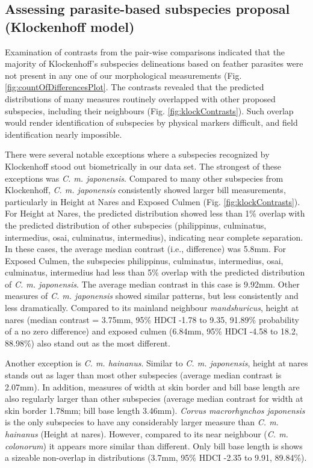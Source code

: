 \documentclass[10pt,a4paper]{article}
\begin{document}
\subsection{Assessing parasite-based subspecies proposal (Klockenhoff model)}\label{assessing-parasite-based-subspecies-proposal-klockenhoff-model}

Examination of contrasts from the pair-wise comparisons indicated that the majority of Klockenhoff's subspecies delineations based on feather parasites were not present in any one of our morphological measurements (Fig. \ref{fig:countOfDifferencesPlot}.
The contrasts revealed that the predicted distributions of many measures routinely overlapped with other proposed subspecies, including their neighbours (Fig. \ref{fig:klockContrasts}).
Such overlap would render identification of subspecies by physical markers difficult, and field identification nearly impossible.

There were several notable exceptions where a subspecies recognized by Klockenhoff stood out biometrically in our data set.
The strongest of these exceptions was \emph{C. m. japonensis}.
Compared to many other subspecies from Klockenhoff, \emph{C. m. japonensis} consistently showed larger bill measurements, particularly in Height at Nares and Exposed Culmen (Fig. \ref{fig:klockContrasts}).
For Height at Nares, the predicted distribution showed less than 1\% overlap with the predicted distribution of other subspecies (philippinus, culminatus, intermedius, osai, culminatus, intermedius), indicating near complete separation.
In these cases, the average median contrast (i.e., difference) was 5.8mm.
For Exposed Culmen, the subspecies philippinus, culminatus, intermedius, osai, culminatus, intermedius had less than 5\% overlap with the predicted distribution of \emph{C. m. japonensis}.
The average median contrast in this case is 9.92mm.
Other measures of \emph{C. m. japonensis} showed similar patterns, but less consistently and less dramatically.
Compared to its mainland neighbour \emph{mandshuricus}, height at nares (median contrast = 3.75mm, 95\% HDCI -1.78 to 9.35, 91.89\% probability of a no zero difference) and exposed culmen (6.84mm, 95\% HDCI -4.58 to 18.2, 88.98\%) also stand out as the most different.

Another exception is \emph{C. m. hainanus}.
Similar to \emph{C. m. japonensis}, height at nares stands out as lager than most other subspecies (average median contrast is 2.07mm).
In addition, measures of width at skin border and bill base length are also regularly larger than other subspecies (average median contrast for width at skin border 1.78mm; bill base length 3.46mm).
\emph{Corvus macrorhynchos japonensis} is the only subspecies to have any considerably larger measure than \emph{C. m. hainanus} (Height at nares).
However, compared to its near neighbour (\emph{C. m. colonorum}) it appears more similar than different.
Only bill base length is shows a sizeable non-overlap in distributions (3.7mm, 95\% HDCI -2.35 to 9.91, 89.84\%).
\end{document}

